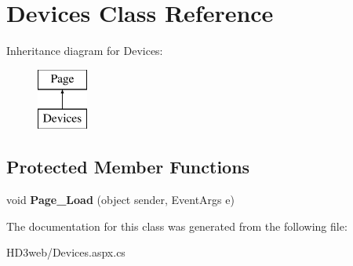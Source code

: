 \hypertarget{class_devices}{\section{Devices Class Reference}
\label{class_devices}
}
Inheritance diagram for Devices\+:\begin{figure}[H]
\begin{center}
\leavevmode
\includegraphics[height=2.000000cm]{class_devices}
\end{center}
\end{figure}
\subsection*{Protected Member Functions}
\begin{DoxyCompactItemize}
\item 
\hypertarget{class_devices_ab5e385bc09f2e7299cd68d6b518fc0c1}{void {\bfseries Page\+\_\+\+Load} (object sender, Event\+Args e)}\label{class_devices_ab5e385bc09f2e7299cd68d6b518fc0c1}

\end{DoxyCompactItemize}


The documentation for this class was generated from the following file\+:\begin{DoxyCompactItemize}
\item 
H\+D3web/Devices.\+aspx.\+cs\end{DoxyCompactItemize}
